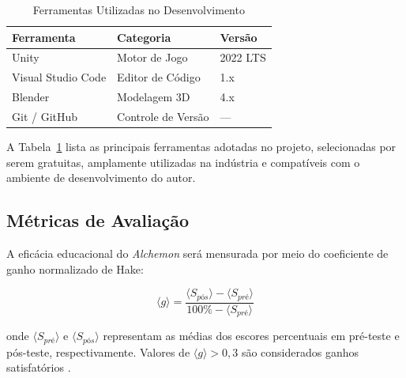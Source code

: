 
\begin{table}[htbp]
    \centering
    \caption{Ferramentas Utilizadas no Desenvolvimento}
    \label{tab:ferramentas}
    \begin{tabular}{@{}lll@{}}
        \toprule
        \textbf{Ferramenta} & \textbf{Categoria} & \textbf{Versão} \\
        \midrule
        Unity               & Motor de Jogo      & 2022 LTS         \\
        Visual Studio Code  & Editor de Código   & 1.x              \\
        Blender             & Modelagem 3D       & 4.x              \\
        Git / GitHub        & Controle de Versão & ---              \\
        \bottomrule
    \end{tabular}
\end{table}

A Tabela~\ref{tab:ferramentas} lista as principais ferramentas adotadas no
projeto, selecionadas por serem gratuitas, amplamente utilizadas na indústria
e compatíveis com o ambiente de desenvolvimento do autor.

\subsection{Métricas de Avaliação}

A eficácia educacional do \textit{Alchemon} será mensurada por meio do
coeficiente de ganho normalizado de Hake:

\begin{equation}
    \langle g \rangle = \frac{\langle S_{pós} \rangle - \langle S_{pré} \rangle}
                             {100\% - \langle S_{pré} \rangle}
    \label{eq:hake}
\end{equation}

\noindent onde $\langle S_{pré} \rangle$ e $\langle S_{pós} \rangle$ representam
as médias dos escores percentuais em pré-teste e pós-teste, respectivamente.
Valores de $\langle g \rangle > 0{,}3$ são considerados ganhos satisfatórios
\cite{gee2003videogames}.

